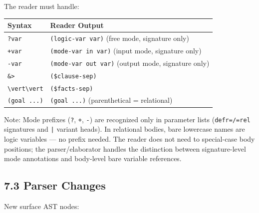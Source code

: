 \documentclass[11pt]{article}
\begin{document}
The reader must handle:

\begin{center}
\begin{tabular}{ll}
Syntax & Reader Output\\
\hline
\texttt{?var} & \texttt{(logic-var var)} (free mode, signature only)\\
\texttt{+var} & \texttt{(mode-var in var)} (input mode, signature only)\\
\texttt{-var} & \texttt{(mode-var out var)} (output mode, signature only)\\
\texttt{\&>} & \texttt{(\$clause-sep)}\\
\texttt{\textbackslash{}vert\textbackslash{}vert} & \texttt{(\$facts-sep)}\\
\texttt{(goal ...)} & \texttt{(goal ...)} (parenthetical = relational)\\
\end{tabular}
\end{center}

Note: Mode prefixes (\texttt{?}, \texttt{+}, \texttt{-}) are recognized only in parameter lists
(\texttt{defr=/=rel} signatures and \texttt{|} variant heads). In relational bodies, bare
lowercase names are logic variables — no prefix needed. The reader does not
need to special-case body positions; the parser/elaborator handles the
distinction between signature-level mode annotations and body-level bare
variable references.
\subsection{7.3 Parser Changes}
\label{sec:orgce7ac97}

New surface AST nodes:
\end{document}

